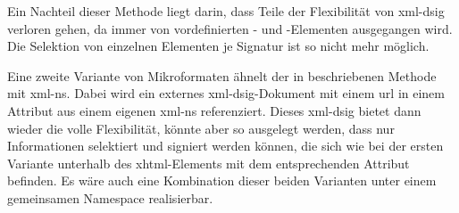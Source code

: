Ein Nachteil dieser Methode liegt darin, dass Teile der Flexibilität von \gls{xml-dsig} verloren gehen, da immer von vordefinierten - und
-Elementen ausgegangen wird. Die Selektion von einzelnen Elementen je Signatur ist so nicht mehr möglich.

Eine zweite Variante von Mikroformaten ähnelt der in  beschriebenen Methode mit \gls{xml-ns}. Dabei wird ein externes
\gls{xml-dsig}-Dokument mit einem \gls{url} in einem Attribut aus einem eigenen \gls{xml-ns} referenziert. Dieses \gls{xml-dsig} bietet dann wieder die volle
Flexibilität, könnte aber so ausgelegt werden, dass nur Informationen selektiert und signiert werden können, die sich wie bei der ersten Variante unterhalb des
\gls{xhtml}-Elements mit dem entsprechenden Attribut befinden. Es wäre auch eine Kombination dieser beiden Varianten unter einem gemeinsamen Namespace
realisierbar.

